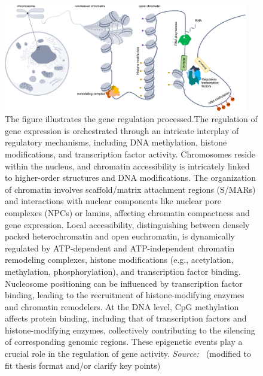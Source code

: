 \begin{figure}[!ht]
	\centering
	\includegraphics[width=0.95\textwidth]{chromatin_organization/fig}
	\vspace{0.1cm}
	\caption[chomosome, chromatin and gene regulation.]{The figure illustrates the gene regulation processed.The regulation of gene expression is orchestrated through an intricate interplay of regulatory mechanisms, including DNA methylation, histone modifications, and transcription factor activity. Chromosomes reside within the nucleus, and chromatin accessibility is intricately linked to higher-order structures and DNA modifications. The organization of chromatin involves scaffold/matrix attachment regions (S/MARs) and interactions with nuclear components like nuclear pore complexes (NPCs) or lamins, affecting chromatin compactness and gene expression. Local accessibility, distinguishing between densely packed heterochromatin and open euchromatin, is dynamically regulated by ATP-dependent and ATP-independent chromatin remodeling complexes, histone modifications (e.g., acetylation, methylation, phosphorylation), and transcription factor binding. Nucleosome positioning can be influenced by transcription factor binding, leading to the recruitment of histone-modifying enzymes and chromatin remodelers. At the DNA level, CpG methylation affects protein binding, including that of transcription factors and histone-modifying enzymes, collectively contributing to the silencing of corresponding genomic regions. These epigenetic events play a crucial role in the regulation of gene activity. \emph{Source: ~\citep{heumos2023best}}(modified to fit thesis format and/or clarify key points)}
	\label{fig:chromatin_organization}
\end{figure}



